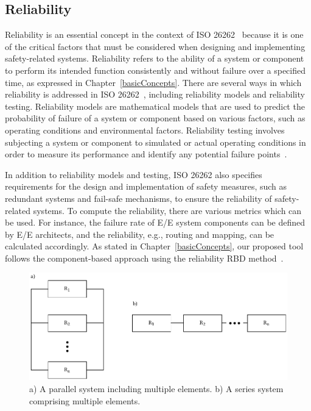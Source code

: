     \subsection{Reliability}
    
    
    Reliability is an essential concept in the context of ISO 26262~\cite{iso26262} because it is one of the critical factors that must be considered when designing and implementing safety-related systems. Reliability refers to the ability of a system or component to perform its intended function consistently and without failure over a specified time, as expressed in Chapter~\ref{basicConcepts}.
    There are several ways in which reliability is addressed in ISO 26262~\cite{iso26262}, including reliability models and reliability testing. Reliability models are mathematical models that are used to predict the probability of failure of a system or component based on various factors, such as operating conditions and environmental factors. Reliability testing involves subjecting a system or component to simulated or actual operating conditions in order to measure its performance and identify any potential failure points~\cite{xie2018reliability}.
    
    In addition to reliability models and testing, ISO 26262 also specifies requirements for the design and implementation of safety measures, such as redundant systems and fail-safe mechanisms, to ensure the reliability of safety-related systems. To compute the reliability, there are various metrics which can be used. For instance, the failure rate of E/E system components can be defined by E/E architects, and the reliability, e.g., routing and mapping, can be calculated accordingly.
    As stated in Chapter~\ref{basicConcepts}, our proposed tool follows the component-based approach using the reliability RBD method~\cite{international2017electric, Menčík16}.
          \begin{figure}[t]
    	\centering
    	\includegraphics[width=1\textwidth]{figures/reliability.pdf}
    	\caption{ a) A parallel system including multiple elements. b) A series system comprising multiple elements.}
    	\label{fig4_reli}
    \end{figure}
    
